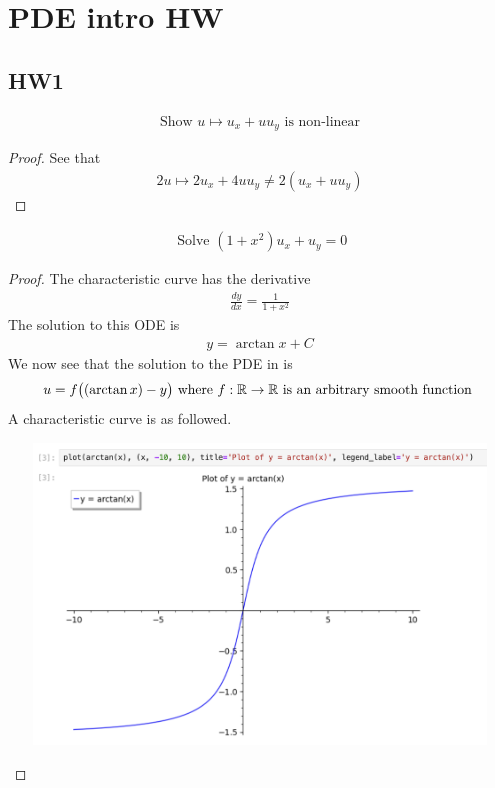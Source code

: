 \documentclass{report}
\begin{document}
\chapter{PDE intro HW}
\section{HW1}
\begin{theorem}
\begin{align*}
\text{ Show }u\mapsto u_x+uu_y\text{ is non-linear }
\end{align*}
\end{theorem}
\begin{proof}
See that 
\begin{align}
\label{he1}
2u\mapsto 2u_x+4uu_y\neq 2(u_x+uu_y)
\end{align}
\end{proof}
\begin{theorem}
\begin{align*}
\text{ Solve }(1+x^2)u_x+u_y=0
\end{align*}
\end{theorem}
\begin{proof}
The characteristic curve has the derivative 
\begin{align*}
\frac{dy}{dx}=\frac{1}{1+x^2}
\end{align*}
The solution to this ODE is 
\begin{align*}
y=\arctan x + C
\end{align*}
We now see that the solution to the PDE in  is 
\begin{align*}
u=f\big((\arctan x)-y\big)\text{ where }f:\mathbb{R}\rightarrow \mathbb{R}\text{ is an arbitrary smooth function }
\end{align*}
A characteristic curve is as followed.
\begin{center}
   \begin{minipage}{0.9\linewidth}  
       \centering       
\includegraphics[height=8cm,width=15cm]{pdehw1}
   \end{minipage}
\end{center}
\end{proof}
\end{document}

